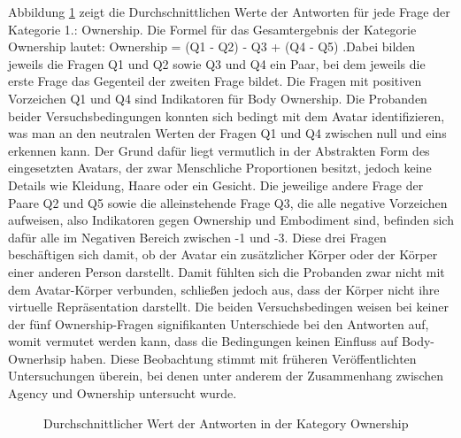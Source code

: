 Abbildung \ref{fig:OwnershipScores} zeigt die Durchschnittlichen Werte der Antworten für jede Frage der Kategorie 1.: Ownership. Die Formel für das Gesamtergebnis der Kategorie Ownership lautet: Ownership = (Q1 - Q2) - Q3 + (Q4 - Q5)
 .Dabei bilden jeweils die Fragen Q1 und Q2 sowie Q3 und Q4 ein Paar, bei dem jeweils die erste Frage das Gegenteil der zweiten Frage bildet. Die Fragen mit positiven Vorzeichen Q1 und Q4 sind Indikatoren für Body Ownership. Die Probanden beider Versuchsbedingungen konnten sich bedingt mit dem Avatar identifizieren, was man an den neutralen Werten der Fragen Q1 und Q4 zwischen null und eins erkennen kann. Der Grund dafür liegt vermutlich in der Abstrakten Form des eingesetzten Avatars, der zwar Menschliche Proportionen besitzt, jedoch keine Details wie Kleidung, Haare oder ein Gesicht.
Die jeweilige andere Frage der Paare Q2 und Q5 sowie die alleinstehende Frage Q3, die alle negative Vorzeichen aufweisen, also Indikatoren gegen Ownership und Embodiment sind, befinden sich dafür alle im Negativen Bereich zwischen -1 und -3. Diese drei Fragen beschäftigen sich damit, ob der Avatar ein zusätzlicher Körper oder der Körper einer anderen Person darstellt. Damit fühlten sich die Probanden zwar nicht mit dem Avatar-Körper verbunden, schließen jedoch aus, dass der Körper nicht ihre virtuelle Repräsentation darstellt.
Die beiden Versuchsbedingen weisen bei keiner der fünf Ownership-Fragen signifikanten Unterschiede bei den Antworten auf, womit vermutet werden kann, dass die Bedingungen keinen Einfluss auf Body-Ownerhsip haben. Diese Beobachtung stimmt mit früheren Veröffentlichten Untersuchungen überein, bei denen unter anderem der Zusammenhang zwischen Agency und Ownership untersucht wurde\cite{Koilias2019}\cite{Kalckert2012}.

\begin{figure}[h]
  \caption[Durchschnittlicher Wert der Antworten in der Kategory Ownership]{Durchschnittlicher Wert der Antworten in der Kategory Ownership}
  \label{fig:OwnershipScores}
\end{figure}



